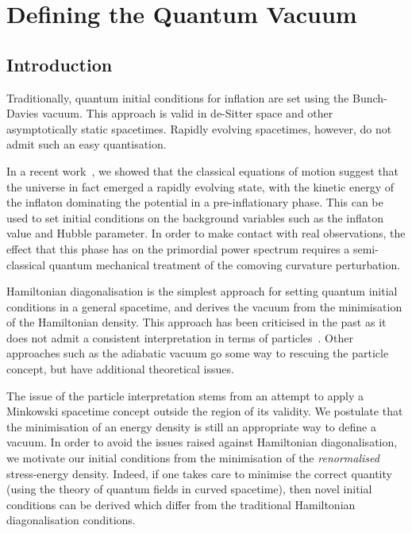 
\chapter{Defining the Quantum Vacuum}
\label{chap:qv}


\section{Introduction}
\label{sec:qv:introduction}
Traditionally, quantum initial conditions for inflation are set using the Bunch-Davies vacuum. This approach is valid in de-Sitter space and other asymptotically static spacetimes. Rapidly evolving spacetimes, however, do not admit such an easy quantisation. 

In a recent work~\cite{Handley+2014}, we showed that the classical equations of motion suggest that the universe in fact emerged a rapidly evolving state, with the kinetic energy of the inflaton dominating the potential in a pre-inflationary phase. 
This can be used to set initial conditions on the background variables such as the inflaton value and Hubble parameter. 
In order to make contact with real observations, the effect that this phase has on the primordial power spectrum requires a semi-classical quantum mechanical treatment of the comoving curvature perturbation.

Hamiltonian diagonalisation is the simplest approach for setting quantum initial conditions in a general spacetime, and derives the vacuum from the minimisation of the Hamiltonian density. This approach has been criticised in the past as it does not admit a consistent interpretation in terms of particles~\cite{Fulling+1989,Fulling_HD}. Other approaches such as the adiabatic vacuum go some way to rescuing the particle concept, but have additional theoretical issues. 

The issue of the particle interpretation stems from an attempt to apply a Minkowski spacetime concept outside the region of its validity.  
We postulate that the minimisation of an energy density is still an appropriate way to define a vacuum. In order to avoid the issues raised against Hamiltonian diagonalisation, we motivate our initial conditions from the minimisation of the {\em renormalised\/} stress-energy density. 
Indeed, if one takes care to minimise the correct quantity (using the theory of quantum fields in curved spacetime), then novel initial conditions can be derived which differ from the traditional Hamiltonian diagonalisation conditions.

